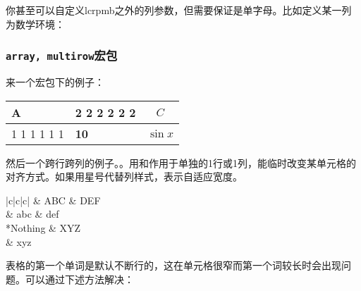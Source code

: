 你甚至可以自定义lcrpmb之外的列参数，但需要保证是单字母。比如定义某一列为数学环境：
\begin{latex}
\end{latex}

\subsubsection{\texttt{array, multirow}宏包}
来一个宏包下的例子：
\begin{codeshow}
\begin{tabular}{|>{\setlength
  \parindent{5mm}}m{1cm}|
  >{\large\bfseries}m{1.5cm}|
  >{$}c<{$}|}
  \hline A & 2 2 2 2 2 2 & C\\
  \hline 1 1 1 1 1 1  & 10 & \sin x \\ \hline
\end{tabular}
\end{codeshow}

然后一个跨行跨列的例子。。用和作用于单独的1行或1列，能临时改变某单元格的对齐方式。如果用星号代替列样式，表示自适应宽度。

\begin{codeshow}
\begin{center}
\begin{tabular}{|c|c|c|}
  \hline
    & ABC & DEF \\
   & abc & def \\
  \hline
    {*{Nothing}} & XYZ \\
   & xyz \\
  \hline
\end{tabular}
\end{center}
\end{codeshow}

表格的第一个单词是默认不断行的，这在单元格很窄而第一个词较长时会出现问题。可以通过下述方法解决：


